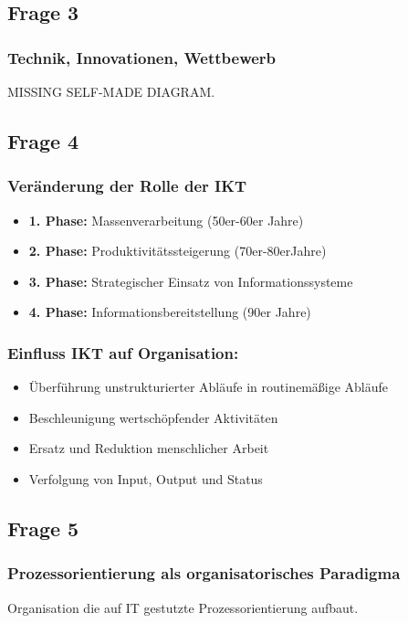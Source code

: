 \documentclass[a4paper]{article}
\begin{document}
\subsection*{Frage 3}
\label{le2-3}
\subsubsection*{Technik, Innovationen, Wettbewerb}
MISSING SELF-MADE DIAGRAM.

\subsection*{Frage 4}
\label{le2-4}
\subsubsection*{Veränderung der Rolle der IKT}
\begin{itemize}
	\item [] \textbf{1. Phase:} Massenverarbeitung (50er-60er Jahre)
	\item [] \textbf{2. Phase:} Produktivitätssteigerung (70er-80erJahre)
	\item [] \textbf{3. Phase:} Strategischer Einsatz von Informationssysteme
	\item [] \textbf{4. Phase:} Informationsbereitstellung (90er Jahre)
\end{itemize}
\hrulefill

\subsubsection*{Einfluss IKT auf Organisation:}
\begin{itemize}
	\item Überführung unstrukturierter Abläufe in routinemäßige Abläufe
	\item Beschleunigung wertschöpfender Aktivitäten
	\item Ersatz und Reduktion menschlicher Arbeit
	\item Verfolgung von Input, Output und Status
\end{itemize}


\subsection*{Frage 5}
\label{le2-5}
\subsubsection*{Prozessorientierung als organisatorisches Paradigma}
Organisation die auf IT gestutzte Prozessorientierung aufbaut.
\end{document}
